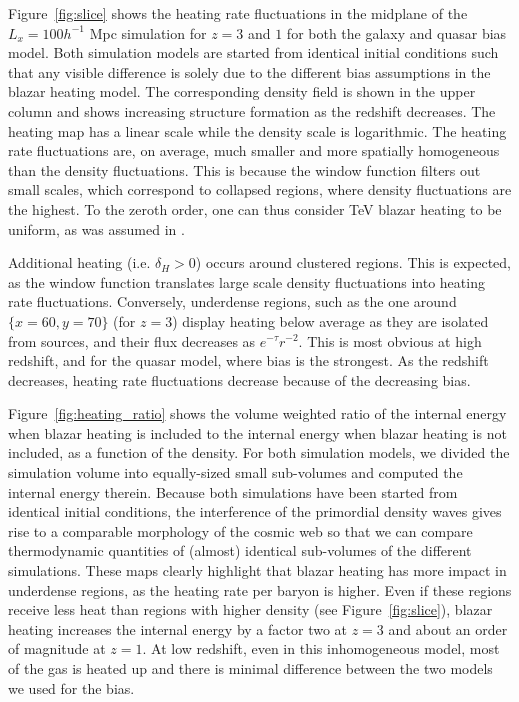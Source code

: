 \documentclass[numberedappendix]{emulateapj}
\begin{document}
Figure~\ref{fig:slice} shows the heating rate fluctuations in the midplane of the $L_x=100h^{-1}$ Mpc simulation for $z=3$ and $1$ for both the galaxy and quasar bias model. Both simulation models are started from identical initial conditions such that any visible difference is solely due to the different bias assumptions in the blazar heating model. The corresponding density field is shown in the upper column and shows increasing structure formation as the redshift decreases. The heating map has a linear scale while the density scale is logarithmic. The heating rate fluctuations are, on average, much smaller and more spatially homogeneous than the density fluctuations. This is because the window function filters out small scales, which correspond to collapsed regions, where density fluctuations are the highest. To the zeroth order, one can thus consider TeV blazar heating to be uniform, as was assumed in \citet{2012ApJ...752...23C}.

Additional heating (i.e. $\delta_H>0$) occurs around clustered regions. This is expected, as the window function translates large scale density fluctuations into heating rate fluctuations. Conversely, underdense regions, such as the one around $\{x=60,y=70\}$ (for $z=3$) display heating below average as they are isolated from sources, and their flux decreases as $e^{-\tau} r^{-2}$. This is most obvious at high redshift, and for the quasar model, where bias is the strongest. As the redshift decreases, heating rate fluctuations decrease because of the decreasing bias.

Figure~\ref{fig:heating_ratio} shows the volume weighted ratio of the internal energy when blazar heating is included to the internal energy when blazar heating is not included, as a function of the density. For both simulation models, we divided the simulation volume into equally-sized small sub-volumes and computed the internal energy therein. Because both simulations have been started from identical initial conditions, the interference of the primordial density waves gives rise to a comparable morphology of the cosmic web so that we can compare thermodynamic quantities of (almost) identical sub-volumes of the different simulations. These maps clearly highlight that blazar heating has more impact in underdense regions, as the heating rate per baryon is higher. Even if these regions receive less heat than regions with higher density (see Figure~\ref{fig:slice}),  blazar heating increases the internal energy by a factor two at $z=3$ and about an order of magnitude at $z=1$. At low redshift, even in this inhomogeneous model, most of the gas is heated up and there is minimal difference between the two models we used for the bias.
\end{document}
